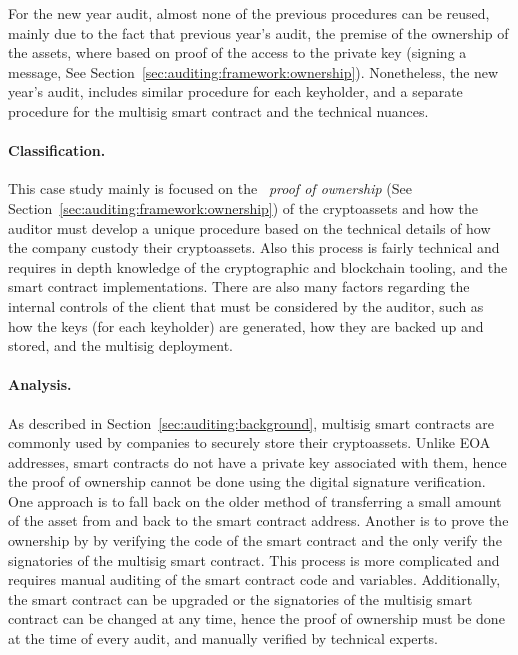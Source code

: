 For the new year audit, almost none of the previous procedures can be reused, mainly due to the fact that previous year's audit, the premise of the ownership of the assets, where based on proof of the access to the private key (\eg signing a message, See Section~\ref{sec:auditing:framework:ownership}). Nonetheless, the new year's audit, includes similar procedure for each keyholder, and a separate procedure for the multisig smart contract and the technical nuances.

\paragraph{Classification.} This case study mainly is focused on the ~\textit{proof of ownership} (See Section~\ref{sec:auditing:framework:ownership}) of the cryptoassets and how the auditor must develop a unique procedure based on the technical details of how the company custody their cryptoassets. Also this process is fairly technical and requires in depth knowledge of the cryptographic and blockchain tooling, and the smart contract implementations. There are also many factors regarding the internal controls of the client that must be considered by the auditor, such as how the keys (for each keyholder) are generated, how they are backed up and stored, and the multisig deployment.


\paragraph{Analysis.} As described in Section~\ref{sec:auditing:background}, multisig smart contracts are commonly used by companies to securely store their cryptoassets. Unlike EOA addresses, smart contracts do not have a private key associated with them, hence the proof of ownership cannot be done using the digital signature verification. One approach is to fall back on the older method of transferring a small amount of the asset from and back to the smart contract address. Another is to prove the ownership by by verifying the code of the smart contract and the only verify the signatories of the multisig smart contract. This process is more complicated and requires manual auditing of the smart contract code and variables. Additionally, the smart contract can be upgraded or the signatories of the multisig smart contract can be changed at any time, hence the proof of ownership must be done at the time of every audit, and manually verified by technical experts. 






